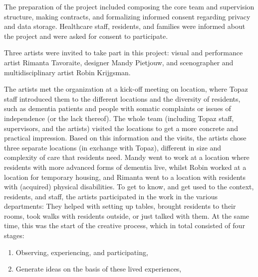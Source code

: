 \documentclass[authordate, empirical,issue]{jote-new-article}
\begin{document}
	{	

	The preparation of the project included \mbox{composing} the core team and supervision structure, making contracts, and formalizing informed consent regarding privacy and data storage. Healthcare staff, residents, and families were informed about the project and were asked for consent to participate.







	Three artists were invited to take part in this project: visual and performance artist Rimanta Tavoraite, designer Mandy Pietjouw, and scenographer and multidisciplinary artist Robin Krijgsman.







	The artists met the organization at a kick-off meeting on location, where Topaz staff introduced them to the different locations and the diversity of residents, such as dementia patients and people with somatic complaints or issues of independence (or the lack thereof). The whole team (including Topaz staff, supervisors, and the artists) visited the locations to get a more concrete and practical impression. Based on this information and the visits, the artists chose three separate locations (in exchange with Topaz), different in size and complexity of care that residents need. Mandy went to work at a location where residents with more advanced forms of dementia live, whilst Robin worked at a location for temporary housing, and Rimanta went to a location with residents with (acquired) physical disabilities. To get to know, and get used to the context, residents, and staff, the artists participated in the work in the various departments: They helped with setting up tables, brought residents to their rooms, took walks with residents outside, or just talked with them. At the same time, this was the start of the creative process, which in total consisted of four stages:





	\begin{enumerate}


		\item Observing, experiencing, and participating,



		\item Generate ideas on the basis of these lived experiences,




\end{enumerate}}
\end{document}

